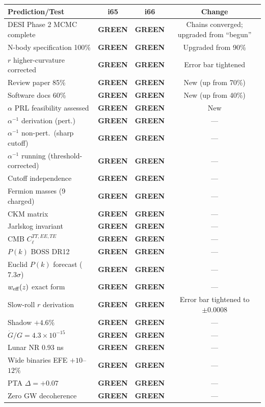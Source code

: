 \documentclass[11pt,a4paper]{article}
\newcommand{\GREEN}{\textcolor{dfdgreen}{\textbf{GREEN}}}
\begin{document}
\begin{center}
\begin{longtable}{p{5cm}ccc}
\toprule
\textbf{Prediction/Test} & \textbf{i65} & \textbf{i66} & \textbf{Change} \\
\midrule
DESI Phase 2 MCMC complete & \GREEN & \GREEN & Chains converged; upgraded from ``begun'' \\
N-body specification 100\% & \GREEN & \GREEN & Upgraded from 90\% \\
$r$ higher-curvature corrected & \GREEN & \GREEN & Error bar tightened \\
Review paper 85\% & \GREEN & \GREEN & New (up from 70\%) \\
Software docs 60\% & \GREEN & \GREEN & New (up from 40\%) \\
$\alpha$ PRL feasibility assessed & \GREEN & \GREEN & New \\
\midrule
$\alpha^{-1}$ derivation (pert.) & \GREEN & \GREEN & --- \\
$\alpha^{-1}$ non-pert.\ (sharp cutoff) & \GREEN & \GREEN & --- \\
$\alpha^{-1}$ running (threshold-corrected) & \GREEN & \GREEN & --- \\
Cutoff independence & \GREEN & \GREEN & --- \\
Fermion masses (9 charged) & \GREEN & \GREEN & --- \\
CKM matrix & \GREEN & \GREEN & --- \\
Jarlskog invariant & \GREEN & \GREEN & --- \\
CMB $C_\ell^{TT,EE,TE}$ & \GREEN & \GREEN & --- \\
$P(k)$ BOSS DR12 & \GREEN & \GREEN & --- \\
Euclid $P(k)$ forecast ($7.3\sigma$) & \GREEN & \GREEN & --- \\
$w_{\rm eff}(z)$ exact form & \GREEN & \GREEN & --- \\
Slow-roll $r$ derivation & \GREEN & \GREEN & Error bar tightened to $\pm 0.0008$ \\
Shadow $+4.6\%$ & \GREEN & \GREEN & --- \\
$\dot{G}/G = 4.3 \times 10^{-15}$ & \GREEN & \GREEN & --- \\
Lunar NR 0.93 ns & \GREEN & \GREEN & --- \\
Wide binaries EFE $+10$--$12\%$ & \GREEN & \GREEN & --- \\
PTA $\Delta = +0.07$ & \GREEN & \GREEN & --- \\
Zero GW decoherence & \GREEN & \GREEN & --- \\

\end{longtable}
\end{center}
\end{document}
